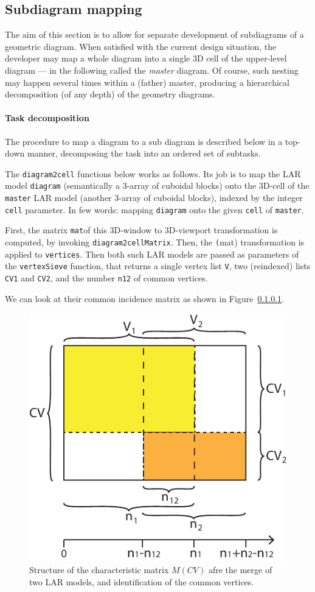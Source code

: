 \documentclass[11pt,oneside]{article}	%
\begin{document}
\subsection{Subdiagram mapping}

The aim of this section is to allow for separate development of subdiagrams of a geometric diagram.
When satisfied with the current design situation,  the developer may map a whole diagram into a single 3D cell of the upper-level diagram --- in the following called the \emph{master} diagram.
Of course, such nesting may happen several times within a (father) master, producing a hierarchical decomposition (of any depth) of the geometry diagrams.


\paragraph{Task decomposition}
The procedure to map a diagram to a sub diagram is described below in a top-down manner,
decomposing the task into an ordered set of subtasks.


The \texttt{diagram2cell} functions below works as follows.  Its job is to map the LAR model \texttt{diagram} (semantically a 3-array of cuboidal blocks) onto the 3D-cell of the \texttt{master} LAR model (another 3-array of cuboidal blocks), indexed by the integer \texttt{cell} parameter. In few words: mapping \texttt{diagram} onto the given \texttt{cell} of \texttt{master}.

First, the matrix \texttt{mat}of this 3D-window to 3D-viewport transformation is computed, by invoking \texttt{diagram2cellMatrix}. Then, the \texttt(mat) transformation is applied to \texttt{vertices}.
Then both such LAR models are passed as parameters of the \texttt{vertexSieve} function, that returns a single vertex list \texttt{V}, two (reindexed) lists \texttt{CV1} and \texttt{CV2}, and the number \texttt{n12} of common vertices.

We can look at their common incidence matrix as shown in Figure~\ref{}.

\begin{figure}[htbp] %
   \centering
   \includegraphics[width=0.4\linewidth]{images/merge} 
   \caption{Structure of the characteristic matrix $M(CV)$ afre the merge of two LAR models, and identification of the common vertices.}
   \label{fig:example}
\end{figure}
\end{document}
